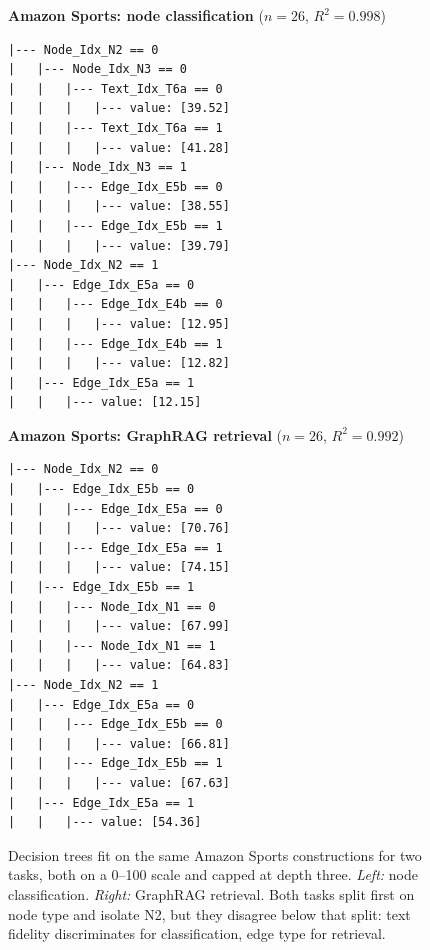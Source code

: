 \begin{figure}[htbp]
\centering
\footnotesize
\begin{minipage}[t]{0.46\textwidth}
\centering\textbf{Amazon Sports: node classification} ($n{=}26$, $R^2{=}0.998$)
\begin{verbatim}
|--- Node_Idx_N2 == 0
|   |--- Node_Idx_N3 == 0
|   |   |--- Text_Idx_T6a == 0
|   |   |   |--- value: [39.52]
|   |   |--- Text_Idx_T6a == 1
|   |   |   |--- value: [41.28]
|   |--- Node_Idx_N3 == 1
|   |   |--- Edge_Idx_E5b == 0
|   |   |   |--- value: [38.55]
|   |   |--- Edge_Idx_E5b == 1
|   |   |   |--- value: [39.79]
|--- Node_Idx_N2 == 1
|   |--- Edge_Idx_E5a == 0
|   |   |--- Edge_Idx_E4b == 0
|   |   |   |--- value: [12.95]
|   |   |--- Edge_Idx_E4b == 1
|   |   |   |--- value: [12.82]
|   |--- Edge_Idx_E5a == 1
|   |   |--- value: [12.15]
\end{verbatim}
\end{minipage}
\hfill
\begin{minipage}[t]{0.46\textwidth}
\centering\textbf{Amazon Sports: GraphRAG retrieval} ($n{=}26$, $R^2{=}0.992$)
\begin{verbatim}
|--- Node_Idx_N2 == 0
|   |--- Edge_Idx_E5b == 0
|   |   |--- Edge_Idx_E5a == 0
|   |   |   |--- value: [70.76]
|   |   |--- Edge_Idx_E5a == 1
|   |   |   |--- value: [74.15]
|   |--- Edge_Idx_E5b == 1
|   |   |--- Node_Idx_N1 == 0
|   |   |   |--- value: [67.99]
|   |   |--- Node_Idx_N1 == 1
|   |   |   |--- value: [64.83]
|--- Node_Idx_N2 == 1
|   |--- Edge_Idx_E5a == 0
|   |   |--- Edge_Idx_E5b == 0
|   |   |   |--- value: [66.81]
|   |   |--- Edge_Idx_E5b == 1
|   |   |   |--- value: [67.63]
|   |--- Edge_Idx_E5a == 1
|   |   |--- value: [54.36]
\end{verbatim}
\end{minipage}
\caption{Decision trees fit on the same Amazon Sports constructions for two tasks, both on a 0--100 scale and capped at depth three. \textit{Left:} node classification. \textit{Right:} GraphRAG retrieval. Both tasks split first on node type and isolate N2, but they disagree below that split: text fidelity discriminates for classification, edge type for retrieval.}
\label{fig:trees-amazon-gnn-graphrag}
\end{figure}
